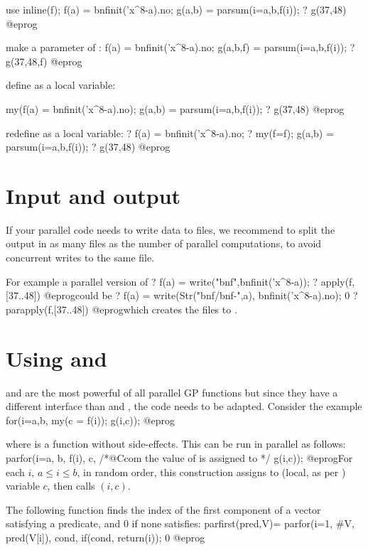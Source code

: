 \item use 
\bprog
inline(f);
f(a) = bnfinit('x^8-a).no;
g(a,b) = parsum(i=a,b,f(i));
? g(37,48)
@eprog

\item make  a parameter of :
\bprog
f(a) = bnfinit('x^8-a).no;
g(a,b,f) = parsum(i=a,b,f(i));
? g(37,48,f)
@eprog

\item define  as a local variable:

\bprog
{
  my(f(a) = bnfinit('x^8-a).no);
  g(a,b) = parsum(i=a,b,f(i));
}
? g(37,48)
@eprog

\item redefine  as a local variable:
\bprog
? f(a) = bnfinit('x^8-a).no;
? my(f=f); g(a,b) = parsum(i=a,b,f(i));
? g(37,48)
@eprog

\section{Input and output}
If your parallel code needs to write data to files, we recommend to split
the output in as many files as the number of parallel computations, to avoid
concurrent writes to the same file.

For example a parallel version of
\bprog
? f(a) = write("bnf",bnfinit('x^8-a));
? apply(f,[37..48])
@eprog\noindent could be
\bprog
? f(a) = write(Str("bnf/bnf-",a), bnfinit('x^8-a).no); 0
? parapply(f,[37..48])
@eprog\noindent which creates the files  to .

\section{Using  and }
 and  are the most powerful of all parallel GP
functions but since they have a different interface than  and
, the code needs to be adapted. Consider the example
\bprog
for(i=a,b,
  my(c = f(i));
  g(i,c));
@eprog\noindent

where  is a function without side-effects.  This can be run in parallel
as follows:
\bprog
parfor(i=a, b,
  f(i),
  c,     /*@Ccom the value of  is assigned to  */
  g(i,c));
@eprog\noindent For each $i$, $a \leq i \leq b$, in random order,
this construction assigns  to (local, as per ) variable
$c$, then calls $(i,c)$.

The following function finds the index of the first component of a vector
satisfying a predicate, and $0$ if none satisfies:
\bprog
parfirst(pred,V)=
{
  parfor(i=1, #V,
    pred(V[i]),
    cond,
    if(cond, return(i));
  0
}
@eprog

